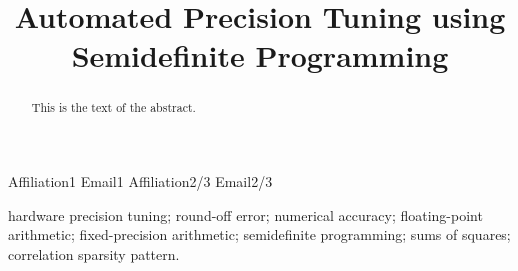 \documentclass[preprint]{sigplanconf}
\theoremstyle{plain}
\begin{document}
\setlength{\pdfpageheight}{\paperheight}
\setlength{\pdfpagewidth}{\paperwidth}






\title{Automated Precision Tuning using Semidefinite Programming}

           {Affiliation1}
           {Email1}
           {Affiliation2/3}
           {Email2/3}

\maketitle

\begin{abstract}
This is the text of the abstract.
\end{abstract}



\keywords
hardware precision tuning; round-off error; numerical accuracy; floating-point arithmetic; fixed-precision arithmetic; semidefinite programming; sums of squares; correlation sparsity pattern.
\end{document}
